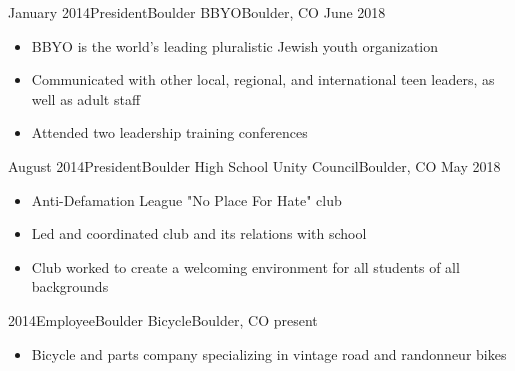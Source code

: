 %
%
%
\begin{experiences}
\emptySeparator
\experience
    {January 2014}{President}{Boulder BBYO}{Boulder, CO}
    {June 2018}{\begin{itemize}
        \item BBYO is the world's leading pluralistic Jewish youth organization
        \item Communicated with other local, regional, and international teen leaders, as well as adult staff
        \item Attended two leadership training conferences
    \end{itemize}}
    \emptySeparator
\experience
    {August 2014}{President}{Boulder High School Unity Council}{Boulder, CO}
    {May 2018}    {
                      \begin{itemize}
                        \item Anti-Defamation League "No Place For Hate" club
                        \item Led and coordinated club and its relations with school
                        \item Club worked to create a welcoming environment for all students of all backgrounds
                      \end{itemize}
                    }
  \emptySeparator
\experience
    {2014}{Employee}{Boulder Bicycle}{Boulder, CO}
    {present}{\begin{itemize}
        \item Bicycle and parts company specializing in vintage road and randonneur bikes

\end{itemize}}
\end{experiences}
